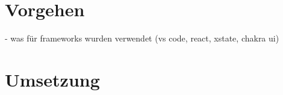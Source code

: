 \chapter{Vorgehen}
- was für frameworks wurden verwendet (vs code, react, xstate, chakra ui)





\chapter{Umsetzung}

